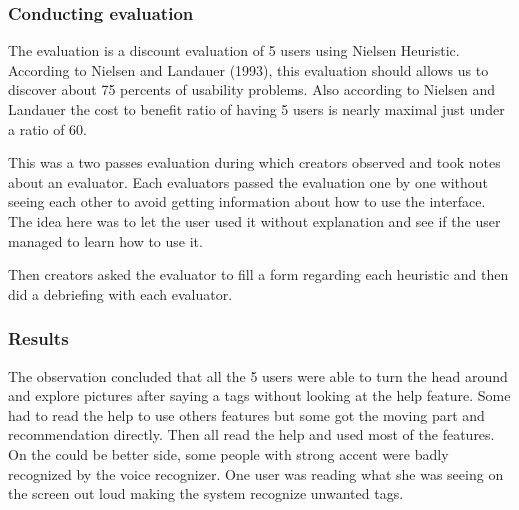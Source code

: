 \documentclass[11pt,a4paper]{article}
\begin{document}
\subsubsection{Conducting evaluation}

The evaluation is a discount evaluation of 5 users using Nielsen Heuristic. According to Nielsen and Landauer (1993), this evaluation should allows us to discover about 75 percents of usability problems. Also according to Nielsen and Landauer the cost to benefit ratio of having 5 users is nearly maximal just under a ratio of 60.

This was a two passes evaluation during which creators observed and took notes about an evaluator. Each evaluators passed the evaluation one by one without seeing each other to avoid getting information about how to use the interface. The idea here was to let the user used it without explanation and see if the user managed to learn how to use it.

Then creators asked the evaluator to fill a form regarding each heuristic and then did a debriefing with each evaluator.

\subsubsection{Results}

The observation concluded that all the 5 users were able to turn the head around and explore pictures after saying a tags without looking at the help feature. Some had to read the help to use others features but some got the moving part and recommendation directly. Then all read the help and used most of the features. On the could be better side, some people with strong accent were badly recognized by the voice recognizer. One user was reading what she was seeing on the screen out loud making the system recognize unwanted tags. 
\end{document}
